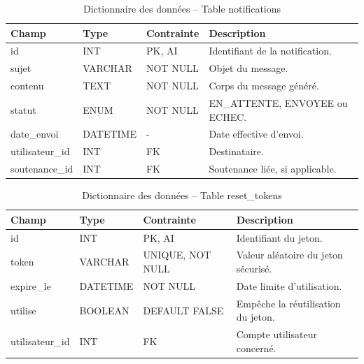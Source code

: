\documentclass[12pt,a4paper]{article}
\begin{document}
\begin{table}[H]
    \centering
    \small
    \begin{tabular}{lp{2cm}lp{6cm}}
        \toprule
        \rowcolor{primary!10}
        \textbf{Champ} & \textbf{Type} & \textbf{Contrainte} & \textbf{Description}                      \\
        \midrule
        id             & INT           & PK, AI              & Identifiant de la notification.           \\
        sujet          & VARCHAR       & NOT NULL            & Objet du message.                         \\
        contenu        & TEXT          & NOT NULL            & Corps du message généré.                  \\
        statut         & ENUM          & NOT NULL            & EN\_ATTENTE, ENVOYEE ou ECHEC.            \\
        date\_envoi    & DATETIME      & -                   & Date effective d'envoi.                   \\
        utilisateur\_id & INT          & FK                  & Destinataire.                             \\
        soutenance\_id & INT           & FK                  & Soutenance liée, si applicable.           \\
        \bottomrule
    \end{tabular}
    \caption{Dictionnaire des données -- Table notifications}
\end{table}

\begin{table}[H]
    \centering
    \small
    \begin{tabular}{lp{2cm}lp{6cm}}
        \toprule
        \rowcolor{primary!10}
        \textbf{Champ} & \textbf{Type} & \textbf{Contrainte} & \textbf{Description}                      \\
        \midrule
        id             & INT           & PK, AI              & Identifiant du jeton.                     \\
        token          & VARCHAR       & UNIQUE, NOT NULL    & Valeur aléatoire du jeton sécurisé.       \\
        expire\_le     & DATETIME      & NOT NULL            & Date limite d'utilisation.                \\
        utilise        & BOOLEAN       & DEFAULT FALSE       & Empêche la réutilisation du jeton.        \\
        utilisateur\_id & INT          & FK                  & Compte utilisateur concerné.              \\
        \bottomrule
    \end{tabular}
    \caption{Dictionnaire des données -- Table reset\_tokens}
\end{table}
\end{document}
